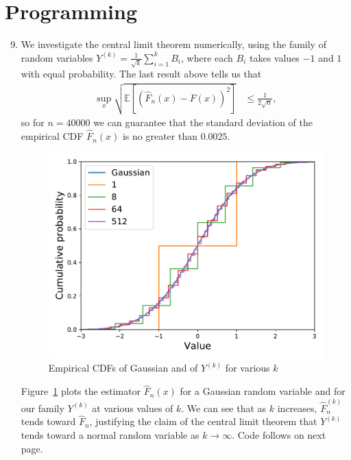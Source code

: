 \documentclass[11pt,letterpaper]{article}
\numberwithin{equation}{section}
\numberwithin{figure}{section}
\begin{document}
\section{Programming}

\begin{enumerate}
	\setcounter{enumi}{8}
	\item We investigate the central limit theorem numerically, using the family of random variables $Y^{(k)} = \frac{1}{\sqrt{k}} \sum_{i=1}^k B_i$, where each $B_i$ takes values $-1$ and $1$ with equal probability. The last result above tells us that
		\begin{align*}
			\sup_x \sqrt{\mathbb{E}[(\hat{F}_n(x)-F(x))^2]} &\leq \frac{1}{2\sqrt{n}},
		\end{align*}
	so for $n=40000$ we can guarantee that the standard deviation of the empirical CDF $\hat{F}_n(x)$ is no greater than $0.0025$.

	\begin{figure}[H]
		\centering
		\includegraphics[width=.7\textwidth]{figures/cdfs.pdf}
		\caption{Empirical CDFs of Gaussian and of $Y^{(k)}$ for various $k$}
		\label{fig:cdfs}		
	\end{figure}

	Figure~\ref{fig:cdfs} plots the estimator $\hat{F}_n(x)$ for a Gaussian random variable and for our family $Y^{(k)}$ at various values of $k$. We can see that as $k$ increases, $\hat{F}_n^{(k)}$ tends toward $\hat{F}_n$, justifying the claim of the central limit theorem that $Y^{(k)}$ tends toward a normal random variable as $k \to \infty$. Code follows on next page.
\end{enumerate}

\clearpage


\end{document}
